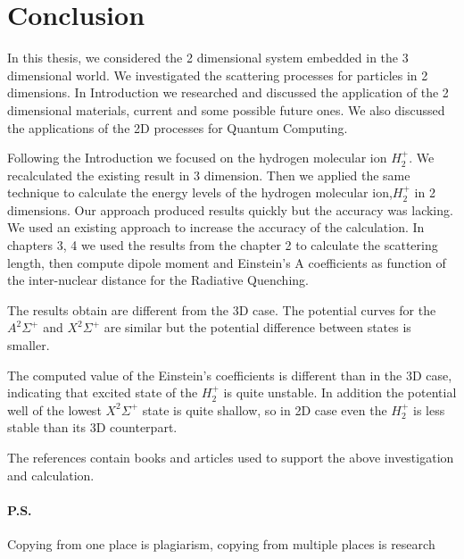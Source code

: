 \chapter{Conclusion}
\label{conclusion}

In this thesis, we considered the 2 dimensional system embedded in the 3 dimensional world. We investigated the scattering processes for particles in 2 dimensions. In Introduction we researched and discussed the application of the 2 dimensional materials, current and some possible future ones. We also discussed the applications of the 2D processes for Quantum Computing.

Following the Introduction we focused on the hydrogen molecular ion $ H_2^{+} $. We recalculated the existing result in 3 dimension. 
Then we applied the same technique to calculate the energy levels of the hydrogen molecular ion,$ H_2^{+} $ in 2 dimensions. Our approach produced results quickly but the accuracy was lacking. We used an existing approach to increase the accuracy of the calculation. In chapters 3, 4 we used the results from the chapter 2 to calculate the scattering length, then compute dipole moment and Einstein's A coefficients as function of the inter-nuclear distance for the Radiative Quenching.

The results obtain are different from the 3D case. The potential curves for the $ A^2\Sigma^+ $ and $X^2\Sigma^+ $ are similar but the potential difference between states is smaller. 

The computed value of the Einstein's coefficients is different than in the 3D case, indicating that excited state of the $ H_2^{+} $ is quite unstable. In addition the potential well of the lowest $ X^2\Sigma^+ $ state is quite shallow, so in 2D case even the  $ H_2^{+} $ is less stable than its 3D counterpart.  

The references contain books and articles used to support the above investigation and calculation.

\subsubsection{P.S.}
Copying from one place is plagiarism, copying from multiple places is research


